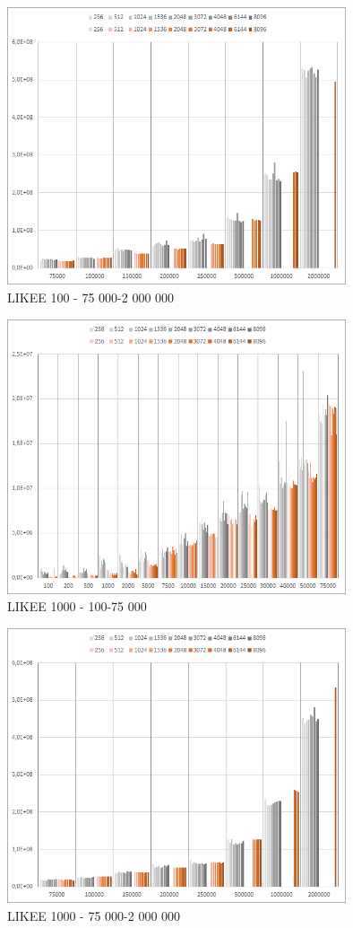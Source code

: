 \documentclass[a4paper, 11pt]{article}
\begin{document}
\begin{figure}[H]
\centering
\includegraphics[width=100mm]{images/n100-75k-2kk.png}
\caption{LIKEE 100 - 75 000-2 000 000}
\end{figure}
\begin{figure}[H]
\centering
\includegraphics[width=100mm]{images/n1000-100-75k.png}
\caption{LIKEE 1000 - 100-75 000}
\end{figure}
\begin{figure}[H]
\centering
\includegraphics[width=100mm]{images/n1000-75k-2kk.png}
\caption{LIKEE 1000 - 75 000-2 000 000}
\end{figure}
\end{document}

